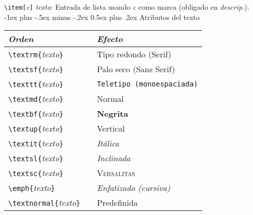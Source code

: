 \documentclass[10pt,landscape,a4paper]{article}
\makeatletter
\renewcommand{\section}{\@startsection{section}{1}{0mm}%
                                {-1ex plus -.5ex minus -.2ex}%
                                {0.5ex plus .2ex}%
                                {\normalfont\large\bfseries}}
\renewcommand{\subsection}{\@startsection{subsection}{2}{0mm}%
                                {-1explus -.5ex minus -.2ex}%
                                {0.5ex plus .2ex}%
                                {\normalfont\normalsize\bfseries}}
\makeatother
\begin{document}
\begin{multicols}{3}
\verb!\item[!\emph{c}\verb!]! \emph{texto}: Entrada de lista usando \emph{c} como marca (obligado en \emph{descrip.}).\\




\section{Atributos del texto}


\newcommand{\FontCmd}[3]{\PBS\verb!\#1{!\emph{texto}\verb!}!  \> %
                         \verb!{\#2 !\emph{texto}\verb!}! \> %
                         \#1{#3}}
\begin{tabular}{@{}l@{}l@{}}
\emph{Orden}  & \emph{Efecto} \\ \hline
\verb!\textrm{!\emph{texto}\verb!}! &\textrm{Tipo redondo (Serif)} \\
\verb!\textsf{!\emph{texto}\verb!}! & \textsf{Palo seco (Sans Serif)} \\
\verb!\texttt{!\emph{texto}\verb!}! & \texttt{Teletipo (monoespaciada)} \\
\verb!\textmd{!\emph{texto}\verb!}! & \textmd{Normal} \\
\verb!\textbf{!\emph{texto}\verb!}! & \textbf{Negrita} \\
\verb!\textup{!\emph{texto}\verb!}! & \textup{Vertical} \\
\verb!\textit{!\textit{texto}\verb!}!& \emph{Itálica} \\
\verb!\textsl{!\emph{texto}\verb!}! & \textsl{Inclinada} \\
\verb!\textsc{!\emph{texto}\verb!}! & \textsc{Versalitas} \\
\verb!\emph{!\emph{texto}\verb!}!  & \emph{Enfatizado (cursiva)} \\
\verb!\textnormal{!\emph{texto}\verb!}  ! & \textnormal{Predefinida} \\[0.7mm]
\end{tabular}


\end{multicols}
\end{document}
